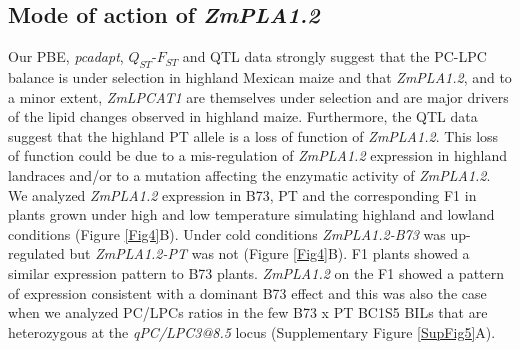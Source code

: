 \documentclass[9pt,twocolumn,twoside]{BioRxiv}
\begin{document}
\subsection{Mode of action of \textit{ZmPLA1.2}} 
Our PBE, \textit{pcadapt}, $Q_{ST}$-$F_{ST}$ and QTL data strongly suggest that the PC-LPC balance is under selection in highland Mexican maize and that \textit{ZmPLA1.2}, and to a minor extent, \textit{ZmLPCAT1} are themselves under selection and are major drivers of the lipid changes observed in highland maize. 
Furthermore, the QTL data suggest that the highland PT allele is a loss of function of \textit{ZmPLA1.2}. 
This loss of function could be due to a mis-regulation of \textit{ZmPLA1.2} expression in highland landraces and/or to a mutation affecting the enzymatic activity of \textit{ZmPLA1.2}. 
We analyzed \textit{ZmPLA1.2} expression in B73, PT and the corresponding F1 in plants grown under high and low temperature simulating highland and lowland conditions (Figure \ref{Fig4}B). 
Under cold conditions \textit{ZmPLA1.2-B73} was up-regulated but \textit{ZmPLA1.2-PT} was not (Figure \ref{Fig4}B). F1 plants showed a similar expression pattern to B73 plants.
\textit{ZmPLA1.2} on the F1 showed a pattern of expression consistent with a dominant B73 effect and this was also the case when we analyzed PC/LPCs ratios in the few B73 x PT BC1S5 BILs that are heterozygous at the \textit{qPC/LPC3@8.5} locus (Supplementary Figure \ref{SupFig5}A).
\end{document}
